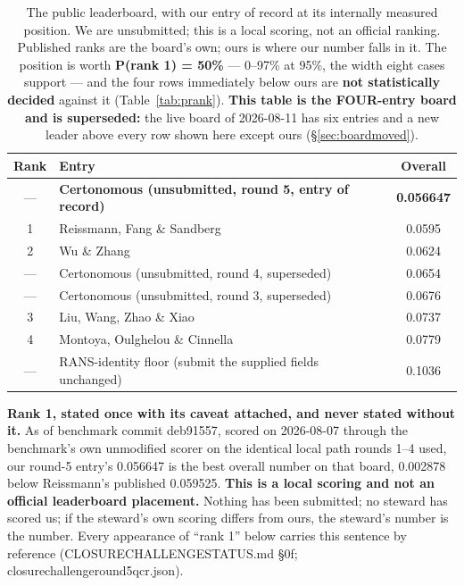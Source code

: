 \documentclass[11pt,a4paper]{article}
\newcommand{\breakus}{\textunderscore\allowbreak}
\newcommand{\code}[1]{{\small\ttfamily\let\_\breakus #1}}
\newcommand{\artifact}[1]{{\footnotesize\ttfamily\let\_\breakus #1}}
\begin{document}
\begin{table}[h]
\centering
\small
\caption{The public leaderboard, with our entry of record at its internally measured
position. We are unsubmitted; this is a local scoring, not an official ranking. Published
ranks are the board's own; ours is where our number falls in it. The position is worth
\textbf{P(rank 1) = 50\%} --- 0--97\% at 95\%, the width eight cases support --- and the four
rows immediately below ours are \textbf{not statistically decided} against it
(Table~\ref{tab:prank}). \textbf{This table is the FOUR-entry board and is superseded:} the live
board of 2026-08-11 has six entries and a new leader above every row shown here except ours
(\S\ref{sec:boardmoved}).}
\label{tab:board}
\begin{tabular}{clc}
\toprule
Rank & Entry & Overall \\
\midrule
--- & \textbf{Certonomous (unsubmitted, round 5, entry of record)} & \textbf{0.056647} \\
1 & Reissmann, Fang \& Sandberg & 0.0595 \\
2 & Wu \& Zhang & 0.0624 \\
--- & Certonomous (unsubmitted, round 4, superseded) & 0.0654 \\
--- & Certonomous (unsubmitted, round 3, superseded) & 0.0676 \\
3 & Liu, Wang, Zhao \& Xiao & 0.0737 \\
4 & Montoya, Oulghelou \& Cinnella & 0.0779 \\
\midrule
--- & RANS-identity floor (submit the supplied fields unchanged) & 0.1036 \\
\bottomrule
\end{tabular}
\end{table}

\noindent\textbf{Rank 1, stated once with its caveat attached, and never stated without
it.} As of benchmark commit \code{deb91557}, scored on 2026-08-07 through the benchmark's
own unmodified scorer on the identical local path rounds 1--4 used, our round-5 entry's
0.056647 is the best overall number on that board, 0.002878 below Reissmann's published
0.059525. \textbf{This is a local scoring and not an official leaderboard placement.}
Nothing has been submitted; no steward has scored us; if the steward's own scoring differs
from ours, the steward's number is the number. Every appearance of ``rank 1'' below
carries this sentence by reference (\artifact{CLOSURE\_CHALLENGE\_STATUS.md} \S0f;
\artifact{closure\_challenge\_round5\_qcr.json}).
\end{document}
